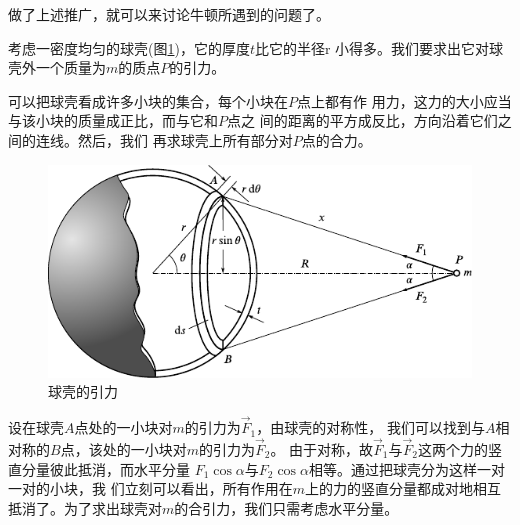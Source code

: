 做了上述推广，就可以来讨论牛顿所遇到的问题了。

考虑一密度均匀的球壳(图\ref{fig:04.10})，它的厚度$ t $比它的半径$  $r
小得多。我们要求出它对球壳外一个质量为$ m $的质点$ P $的引力。

可以把球壳看成许多小块的集合，每个小块在$ P $点上都有作
用力，这力的大小应当与该小块的质量成正比，而与它和$ P $点之
间的距离的平方成反比，方向沿着它们之间的连线。然后，我们
再求球壳上所有部分对$ P $点的合力。
\begin{figure}[h]
  \centering
  \includegraphics{figure/fig04.10}
  \caption{球壳的引力}
  \label{fig:04.10}
  \vspace{-0.8em}
\end{figure}

设在球壳$ A $点处的一小块对$ m $的引力为$ \vec{F} _ { 1 } $，由球壳的对称性，
我们可以找到与$ A $相对称的$ B $点，该处的一小块对$ m $的引力为$ \vec{F} _ { 2 } $。
由于对称，故$ \vec{F} _ { 1 } $与$ \vec{F} _ { 2 } $这两个力的竖直分量彼此抵消，而水平分量
$ F _ { 1 } \cos \alpha $与$ F _ { 2 } \cos \alpha $相等。通过把球壳分为这样一对一对的小块，我
们立刻可以看出，所有作用在$ m $上的力的竖直分量都成对地相互
抵消了。为了求出球壳对$ m $的合引力，我们只需考虑水平分量。

